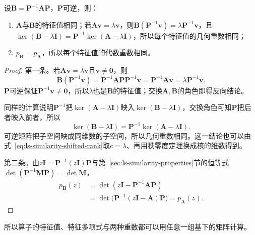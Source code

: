 \begin{theorem}[谱的相似不变性]
\label{thm:ls-spectrum-similarity-invariance}
设$\bm B=\bm P^{-1}\bm A\bm P$，$\bm P$可逆，则：
\begin{enumerate}
 \item $\bm A$与$\bm B$的特征值相同；若$\bm A\bm v=\lambda\bm v$，则$\bm B(\bm P^{-1}\bm v)=\lambda\bm P^{-1}\bm v$，且$\ker(\bm B-\lambda\bm I)=\bm P^{-1}\ker(\bm A-\lambda\bm I)$，所以每个特征值的几何重数相同；
 \item $p_{\bm B}=p_{\bm A}$，所以每个特征值的代数重数相同。
\end{enumerate}
\end{theorem}
\begin{proof}
第一条。若$\bm A\bm v=\lambda\bm v$且$\bm v\neq\bm0$，则
\[
 \bm B(\bm P^{-1}\bm v)=\bm P^{-1}\bm A\bm P\bm P^{-1}\bm v=\bm P^{-1}\bm A\bm v=\lambda\bm P^{-1}\bm v .
\]
$\bm P$可逆保证$\bm P^{-1}\bm v\neq\bm0$，所以$\lambda$也是$\bm B$的特征值；交换$\bm A,\bm B$的角色即得反向结论。

同样的计算说明$\bm P^{-1}$把$\ker(\bm A-\lambda\bm I)$映入$\ker(\bm B-\lambda\bm I)$，交换角色可知$\bm P$把后者映入前者，所以
\[
 \ker(\bm B-\lambda\bm I)=\bm P^{-1}\ker(\bm A-\lambda\bm I).
\]
可逆矩阵把子空间映成同维数的子空间，所以几何重数相同。这一结论也可以由式~\eqref{eq:ls-similarity-shifted-rank}取$c=\lambda$、再用秩零度定理换成核的维数得到。

第二条。由$z\bm I=\bm P^{-1}(z\bm I)\bm P$与第~\ref{sec:ls-similarity-properties}节的恒等式$\det(\bm P^{-1}\bm M\bm P)=\det\bm M$，
\[
 \begin{aligned}
 p_{\bm B}(z)&=\det(z\bm I-\bm P^{-1}\bm A\bm P)\\
 &=\det\bigl(\bm P^{-1}(z\bm I-\bm A)\bm P\bigr)=p_{\bm A}(z).
 \end{aligned}
\]
\end{proof}
所以算子的特征值、特征多项式与两种重数都可以用任意一组基下的矩阵计算。

